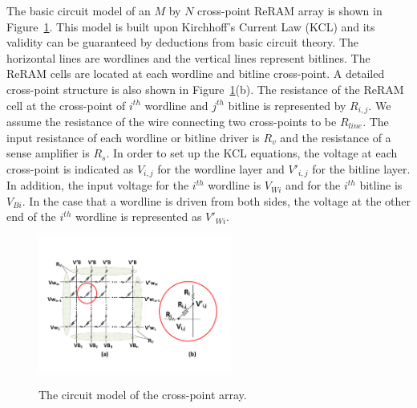 The basic circuit model of an $M$ by $N$ cross-point ReRAM array is shown
in Figure~\ref{fig:modeling}. This model is built upon Kirchhoff's Current
Law (KCL) and its validity can be guaranteed by deductions from basic
circuit theory. The horizontal lines are wordlines and the vertical lines
represent bitlines. The ReRAM cells are located at each wordline and
bitline cross-point. A detailed cross-point structure is also shown in
Figure~\ref{fig:modeling}(b). The resistance of the ReRAM cell at the
cross-point of $i^{th}$ wordline and $j^{th}$ bitline is represented by
$R_{i,j}$. We assume the resistance of the wire connecting two
cross-points to be $R_{line}$. The input resistance of each wordline or
bitline driver is $R_v$ and the resistance of a sense amplifier is $R_s$.
In order to set up the KCL equations, the voltage at each cross-point is
indicated as $V_{i,j}$ for the wordline layer and $V'_{i,j}$ for the
bitline layer. In addition, the input voltage for the $i^{th}$ wordline is
$V_{Wi}$ and for the $i^{th}$ bitline is $V_{Bi}$. In the case that a
wordline is driven from both sides, the voltage at the other end of the
$i^{th}$ wordline is represented as $V'_{Wi}$.


\begin{figure}%
\centering
  \includegraphics[width=2.5in]{./figures/model_f.pdf}\\
  \vspace{-8pt}
  \caption{The circuit model of the cross-point array.}\label{fig:modeling}
  \vspace{-4pt}
\end{figure}


